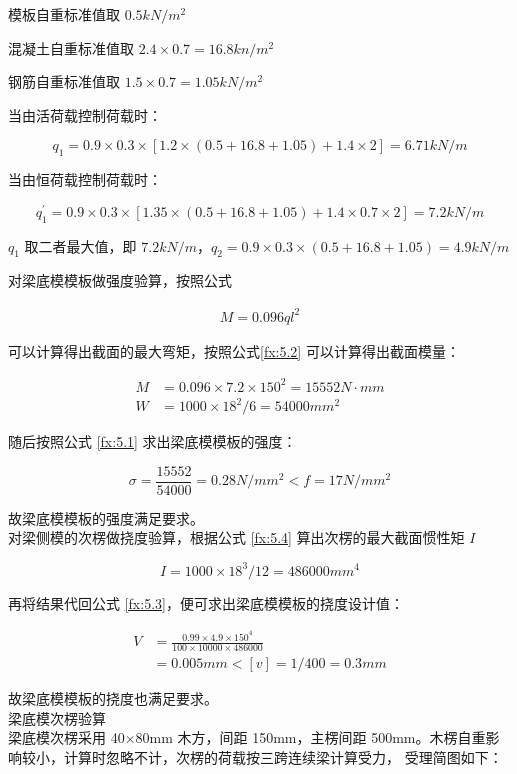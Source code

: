 模板自重标准值取 $0.5 kN/m^2$

混凝土自重标准值取 $2.4\times 0.7=16.8 kn/m^2$

钢筋自重标准值取 $1.5\times 0.7=1.05 kN/m^2$

当由活荷载控制荷载时：

\[q_1=0.9\times 0.3\times[1.2\times(0.5+16.8+1.05)+1.4\times 2]=6.71 kN/m\]

当由恒荷载控制荷载时：

\[q_1^{'}=0.9\times 0.3\times[1.35\times(0.5+16.8+1.05)+1.4\times0.7\times 2]=7.2 kN/m\]

$q_1$ 取二者最大值，即 $7.2 kN/m$，$q_2=0.9\times 0.3\times (0.5+16.8+1.05)=4.9 kN/m$

对梁底模模板做强度验算，按照公式

\begin{align}
    \label{fx:5.X}
    M=0.096ql^2
\end{align}

可以计算得出截面的最大弯矩，按照公式\ref{fx:5.2} 可以计算得出截面模量：

\begin{align*}
    M&=0.096\times 7.2\times 150^2=15552 N \cdot mm\\
    W&=1000\times 18^2 /6=54000 mm^2
\end{align*}

随后按照公式 \ref{fx:5.1} 求出梁底模模板的强度：

\[
    \sigma = \frac{15552}{54000}=0.28 N/mm^2< f=17N/mm^2
\]

故梁底模模板的强度满足要求。\\

对梁侧模的次楞做挠度验算，根据公式 \ref{fx:5.4} 算出次楞的最大截面惯性矩 $I$

\[
    I=1000\times 18^3 /12=486000 mm^4
\]

再将结果代回公式 \ref{fx:5.3}，便可求出梁底模模板的挠度设计值：

\begin{align*}
    V&=\frac{0.99\times 4.9 \times 150^4}{100\times 10000\times 486000}\\
    &=0.005 mm<[v]=1/400=0.3mm
\end{align*}

故梁底模模板的挠度也满足要求。\\

 梁底模次楞验算\\

梁底模次楞采用 40×80mm 木方，间距 150mm，主楞间距 500mm。木楞自重影响较小，计算时忽略不计，次楞的荷载按三跨连续梁计算受力，
受理简图如下：

